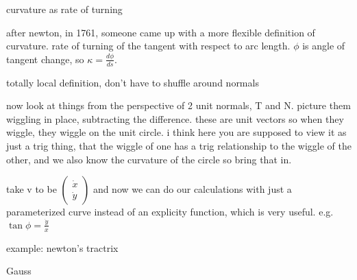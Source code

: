\documentclass{article}
\newenvironment{andrew_section}[1]
    {
    \section{#1}
    \begin{itemize}
    }
    {
    \end{itemize}
    }
\begin{document}
\begin{andrew_section}{curvature as rate of turning}
    \item 
        after newton, in 1761, someone came up with a more flexible
        definition of curvature. rate of turning of the tangent
        with respect to arc length.  $\phi$ is angle of tangent change,
        so $\kappa = \frac{d\phi}{ds}$.
    \item 
        totally local definition, don't have to shuffle around normals
    \item 
        now look at things from the perspective of 2 unit normals,
        T and N. picture them wiggling in place, subtracting the 
        difference. these are unit vectors so when they wiggle, they
        wiggle on the unit circle.  i think here you are supposed to
        view it as just a trig thing, that the wiggle of one has a trig
        relationship to the wiggle of the other, and we also know the curvature
        of the circle so bring that in.
    \item 
    take v to be
    $\begin{pmatrix}
        \dot x \\
        \dot y
        \end{pmatrix}$
    and now we can do our calculations with just a parameterized curve
    instead of an explicity function, which is very useful.  e.g.
    $\tan{\phi} = \frac{\dot y}{\dot x}$
\end{andrew_section}

\begin{andrew_section}{example: newton's tractrix}
    \item 
        Gauss
\end{andrew_section}
\end{document}
